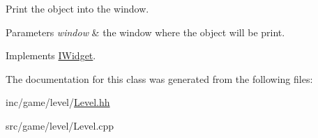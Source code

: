 Print the object into the window. 


\begin{DoxyParams}{Parameters}
{\em \textquotesingle{}window\textquotesingle{}} & the window where the object will be print. \\
\hline
\end{DoxyParams}


Implements \hyperlink{classIWidget_a0cfa49a402e9bb31808a715e048ab2f4}{I\+Widget}.



The documentation for this class was generated from the following files\+:\begin{DoxyCompactItemize}
\item 
inc/game/level/\hyperlink{Level_8hh}{Level.\+hh}\item 
src/game/level/Level.\+cpp\end{DoxyCompactItemize}
